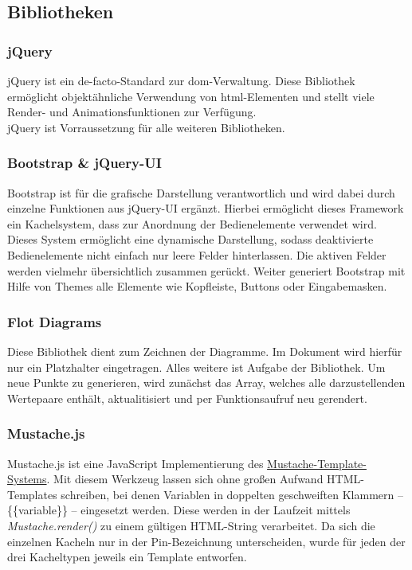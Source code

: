 \subsection{Bibliotheken}

\subsubsection{jQuery}
jQuery ist ein \gls{de-facto-Standard} zur \gls{dom}-Verwaltung. Diese Bibliothek ermöglicht objektähnliche Verwendung von \gls{html}-Elementen und stellt viele Render- und Animationsfunktionen zur Verfügung.\\

jQuery ist Vorraussetzung für alle weiteren Bibliotheken.


\subsubsection{Bootstrap \& jQuery-UI}
Bootstrap ist für die grafische Darstellung verantwortlich und wird dabei durch einzelne Funktionen aus jQuery-UI ergänzt. Hierbei ermöglicht dieses Framework ein Kachelsystem, dass zur Anordnung der Bedienelemente verwendet wird. Dieses System ermöglicht eine dynamische Darstellung, sodass deaktivierte Bedienelemente nicht einfach nur leere Felder hinterlassen. Die aktiven Felder werden vielmehr übersichtlich zusammen gerückt. Weiter generiert Bootstrap mit Hilfe von Themes alle Elemente wie Kopfleiste, Buttons oder Eingabemasken.\\


\subsubsection{Flot Diagrams}
Diese Bibliothek dient zum Zeichnen der Diagramme. Im Dokument wird hierfür nur ein Platzhalter eingetragen. Alles weitere ist Aufgabe der Bibliothek. Um neue Punkte zu generieren, wird zunächst das Array, welches alle darzustellenden Wertepaare enthält, aktualitisiert und per Funktionsaufruf neu gerendert.


\subsubsection{Mustache.js}
Mustache.js ist eine JavaScript Implementierung des \href{http://mustache.github.io/}{Mustache-Template-Systems}. Mit diesem Werkzeug lassen sich ohne großen Aufwand HTML-Templates schreiben, bei denen Variablen in doppelten geschweiften Klammern -- \{\{variable\}\} -- eingesetzt werden. Diese werden in der Laufzeit mittels \textit{Mustache.render()} zu einem gültigen HTML-String verarbeitet. Da sich die einzelnen Kacheln nur in der Pin-Bezeichnung unterscheiden, wurde für jeden der drei Kacheltypen jeweils ein Template entworfen.